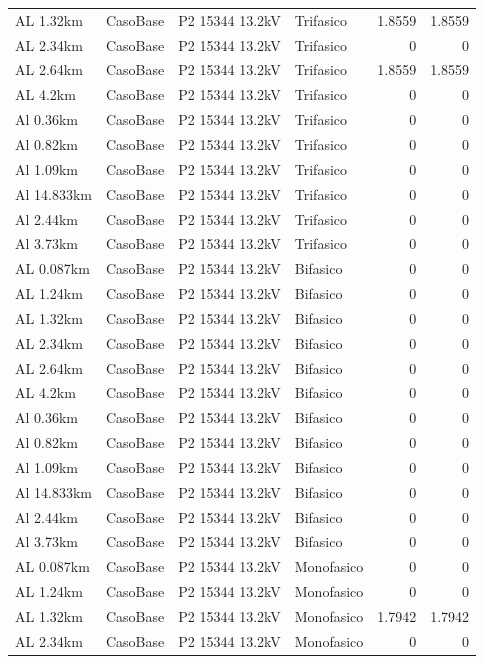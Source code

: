 \documentclass[11pt,a4paper]{article}
\begin{document}
\begin{longtable}{llllrr}
AL 1.32km & CasoBase & P2 15344 13.2kV & Trifasico & 1.8559 & 1.8559 \\
AL 2.34km & CasoBase & P2 15344 13.2kV & Trifasico & 0 & 0 \\
AL 2.64km & CasoBase & P2 15344 13.2kV & Trifasico & 1.8559 & 1.8559 \\
AL 4.2km & CasoBase & P2 15344 13.2kV & Trifasico & 0 & 0 \\
Al 0.36km & CasoBase & P2 15344 13.2kV & Trifasico & 0 & 0 \\
Al 0.82km & CasoBase & P2 15344 13.2kV & Trifasico & 0 & 0 \\
Al 1.09km & CasoBase & P2 15344 13.2kV & Trifasico & 0 & 0 \\
Al 14.833km & CasoBase & P2 15344 13.2kV & Trifasico & 0 & 0 \\
Al 2.44km & CasoBase & P2 15344 13.2kV & Trifasico & 0 & 0 \\
Al 3.73km & CasoBase & P2 15344 13.2kV & Trifasico & 0 & 0 \\
AL 0.087km & CasoBase & P2 15344 13.2kV & Bifasico & 0 & 0 \\
AL 1.24km & CasoBase & P2 15344 13.2kV & Bifasico & 0 & 0 \\
AL 1.32km & CasoBase & P2 15344 13.2kV & Bifasico & 0 & 0 \\
AL 2.34km & CasoBase & P2 15344 13.2kV & Bifasico & 0 & 0 \\
AL 2.64km & CasoBase & P2 15344 13.2kV & Bifasico & 0 & 0 \\
AL 4.2km & CasoBase & P2 15344 13.2kV & Bifasico & 0 & 0 \\
Al 0.36km & CasoBase & P2 15344 13.2kV & Bifasico & 0 & 0 \\
Al 0.82km & CasoBase & P2 15344 13.2kV & Bifasico & 0 & 0 \\
Al 1.09km & CasoBase & P2 15344 13.2kV & Bifasico & 0 & 0 \\
Al 14.833km & CasoBase & P2 15344 13.2kV & Bifasico & 0 & 0 \\
Al 2.44km & CasoBase & P2 15344 13.2kV & Bifasico & 0 & 0 \\
Al 3.73km & CasoBase & P2 15344 13.2kV & Bifasico & 0 & 0 \\
AL 0.087km & CasoBase & P2 15344 13.2kV & Monofasico & 0 & 0 \\
AL 1.24km & CasoBase & P2 15344 13.2kV & Monofasico & 0 & 0 \\
AL 1.32km & CasoBase & P2 15344 13.2kV & Monofasico & 1.7942 & 1.7942 \\
AL 2.34km & CasoBase & P2 15344 13.2kV & Monofasico & 0 & 0 \\

\end{longtable}
\end{document}
